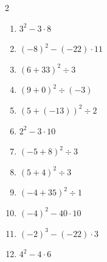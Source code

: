 \documentclass[11pt]{article}
\begin{document}
\begin{multicols}{2}
\begin{enumerate}
  \vspace{1.1cm}
  \item $3^{2} - 3 \cdot 8$
  \vspace{1.1cm}
  \item $(-8)^{2} - (-22) \cdot 11$
  \vspace{1.1cm}
  \item $(6 + 33)^{2} \div 3$
  \vspace{1.1cm}
  \item $(9 + 0)^{2} \div (-3)$
  \vspace{1.1cm}
  \item $(5 + (-13))^{2} \div 2$
  \vspace{1.1cm}
  \item $2^{2} - 3 \cdot 10$
  \vspace{1.1cm}
  \item $(-5 + 8)^{2} \div 3$
  \vspace{1.1cm}
  \item $(5 + 4)^{2} \div 3$
  \vspace{1.1cm}
  \item $(-4 + 35)^{2} \div 1$
  \vspace{1.1cm}
  \item $(-4)^{2} - 40 \cdot 10$
  \vspace{1.1cm}
  \item $(-2)^{3} - (-22) \cdot 3$
  \vspace{1.1cm}
  \item $4^{2} - 4 \cdot 6$
  \vspace{1.1cm}
\end{enumerate}
\end{multicols}
\end{document}
